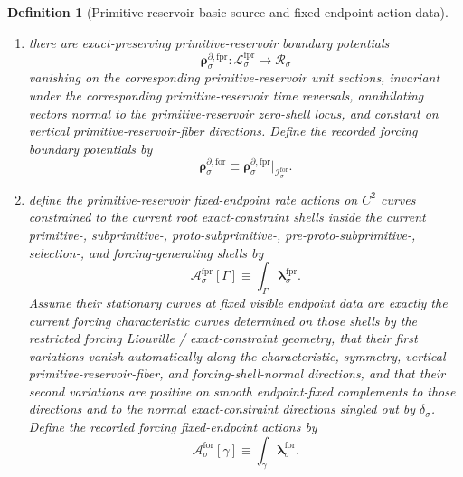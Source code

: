 \documentclass[11pt]{article}
\newcommand{\PhaseReadClass}[1]{\mathscr R_{#1}}
\newcommand{\ConstraintGap}[1]{\delta_{#1}}
\newcommand{\ForSpace}[1]{\mathcal I_{#1}^{\mathrm{for}}}
\newcommand{\ForRateForm}[1]{\boldsymbol{\lambda}_{#1}^{\mathrm{for}}}
\newcommand{\ForFluxSource}[1]{\boldsymbol{j}_{#1}^{\mathrm{for}}}
\newcommand{\ForBoundarySource}[1]{\boldsymbol{\rho}_{#1}^{\partial,\mathrm{for}}}
\newcommand{\ForAction}[1]{\mathscr A_{#1}^{\mathrm{for}}}
\newcommand{\ForPrimSpace}[1]{\mathcal L_{#1}^{\mathrm{fpr}}}
\newcommand{\ForPrimRateForm}[1]{\boldsymbol{\lambda}_{#1}^{\mathrm{fpr}}}
\newcommand{\ForPrimFluxSource}[1]{\boldsymbol{j}_{#1}^{\mathrm{fpr}}}
\newcommand{\ForPrimBoundarySource}[1]{\boldsymbol{\rho}_{#1}^{\partial,\mathrm{fpr}}}
\newcommand{\ForPrimAction}[1]{\mathscr A_{#1}^{\mathrm{fpr}}}
\newtheorem{definition}{Definition}
\begin{document}
\begin{definition}[Primitive-reservoir basic source and fixed-endpoint action data]
\begin{enumerate}
\begin{equation}
    \qquad
    \ForFluxSource{\sigma}\equiv \ForPrimFluxSource{\sigma}|_{\ForSpace{\sigma}}.
    \label{eq:forcing_sources_from_reservoir}
    \end{equation}
    \item there are exact-preserving primitive-reservoir boundary potentials
    \[
    \ForPrimBoundarySource{\sigma}:\ForPrimSpace{\sigma}\to\PhaseReadClass{\sigma}
    \]
    vanishing on the corresponding primitive-reservoir unit sections, invariant under the corresponding primitive-reservoir time reversals, annihilating vectors normal to the primitive-reservoir zero-shell locus, and constant on vertical primitive-reservoir-fiber directions. Define the recorded forcing boundary potentials by
    \begin{equation}
    \ForBoundarySource{\sigma}\equiv \ForPrimBoundarySource{\sigma}|_{\ForSpace{\sigma}}.
    \label{eq:forcing_boundary_from_reservoir}
    \end{equation}
    \item define the primitive-reservoir fixed-endpoint rate actions on \(C^2\) curves constrained to the current root exact-constraint shells inside the current primitive-, subprimitive-, proto-subprimitive-, pre-proto-subprimitive-, selection-, and forcing-generating shells by
    \begin{equation}
    \ForPrimAction{\sigma}[\Gamma]\equiv \int_\Gamma \ForPrimRateForm{\sigma}.
    \label{eq:primitive_reservoir_action}
    \end{equation}
    Assume their stationary curves at fixed visible endpoint data are exactly the current forcing characteristic curves determined on those shells by the restricted forcing Liouville / exact-constraint geometry, that their first variations vanish automatically along the characteristic, symmetry, vertical primitive-reservoir-fiber, and forcing-shell-normal directions, and that their second variations are positive on smooth endpoint-fixed complements to those directions and to the normal exact-constraint directions singled out by \(\ConstraintGap{\sigma}\). Define the recorded forcing fixed-endpoint actions by
    \begin{equation}
    \ForAction{\sigma}[\gamma]\equiv \int_\gamma \ForRateForm{\sigma}.
    \label{eq:forcing_action_from_reservoir}
    \end{equation}
\end{enumerate}
\end{definition}
\end{document}

